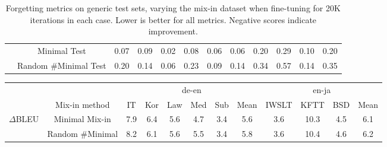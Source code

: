 \documentclass[11pt]{article}
\begin{document}
\begin{table*}[h!]
\begin{tabular}{p{1.8cm}c| ccccc|c| ccc|c}
   &     Minimal Test & 0.07&  0.09 & 0.02 & 0.08& 0.06 & 0.06 &   0.20 & 0.29 & 0.10&  0.20  \\
    &    Random \#Minimal Test &0.20 & 0.14 &0.06 &0.23 & 0.09 & 0.14 &  0.34 & 0.57 &0.14 &  0.35  \\


    \end{tabular}
    \caption{Forgetting metrics on generic test sets, varying the mix-in dataset when fine-tuning for 20K iterations in each case. Lower is better for all metrics. Negative scores indicate improvement.
    }
    \label{tab:mixinbleu-generic-appendix}
\end{table*}


\begin{table*}[h!]
    \centering
   \small 
       \begin{tabular}{cc| ccccc|c| ccc|c}
    &   &  \multicolumn{6}{c|}{de-en} &  \multicolumn{4}{c}{en-ja}\\
    & Mix-in method     & IT & Kor &Law &Med  & Sub & Mean & IWSLT  &KFTT &BSD & Mean \\

             \hline

    \multirow{4}{*}{$\Delta$BLEU}      & Minimal Mix-in & 7.9  &6.4&  5.6& 4.7 &3.4 &  5.6&3.6    &  10.3& 4.5& 6.1\\
      &  Random \#Minimal &8.2& 6.1 &5.6& 5.5&  3.4 &  5.8& 3.6 &  10.4&4.6 & 6.2\\


\end{tabular}
\end{table*}
\end{document}
